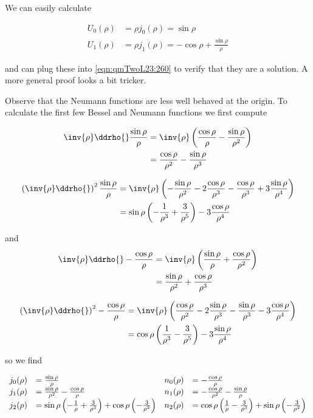 We can easily calculate

\begin{align}\label{eqn:qmTwoL23:300}
U_0(\rho) &= \rho j_0(\rho) = \sin\rho \\
U_1(\rho) &= \rho j_1(\rho) = -\cos\rho + \frac{\sin\rho}{\rho}
\end{align}

and can plug these into \ref{eqn:qmTwoL23:260} to verify that they are a solution.  A more general proof looks a bit tricker.

Observe that the Neumann functions are less well behaved at the origin.  To calculate the first few Bessel and Neumann functions we first compute

\begin{align*}
\inv{\rho} \ddrho{} \frac{\sin\rho}{\rho}
&= \inv{\rho} \left(
\frac{\cos\rho}{\rho}
-\frac{\sin\rho}{\rho^2}
\right) \\
&=
\frac{\cos\rho}{\rho^2}
-\frac{\sin\rho}{\rho^3}
\end{align*}

\begin{align*}
\left( \inv{\rho} \ddrho{} \right)^2 \frac{\sin\rho}{\rho}
&= \inv{\rho} \left(
-\frac{\sin\rho}{\rho^2}
-2\frac{\cos\rho}{\rho^3}
-\frac{\cos\rho}{\rho^3}
+3\frac{\sin\rho}{\rho^4}
\right) \\
&=
\sin\rho\left(
-\frac{1}{\rho^3}
+\frac{3}{\rho^5}
\right)
-3\frac{\cos\rho}{\rho^4}
\end{align*}

and
\begin{align*}
\inv{\rho} \ddrho{} -\frac{\cos\rho}{\rho}
&= \inv{\rho} \left(
\frac{\sin\rho}{\rho}
+\frac{\cos\rho}{\rho^2}
\right) \\
&=
\frac{\sin\rho}{\rho^2}
+\frac{\cos\rho}{\rho^3}
\end{align*}

\begin{align*}
\left( \inv{\rho} \ddrho{} \right)^2 -\frac{\cos\rho}{\rho}
&= \inv{\rho} \left(
\frac{\cos\rho}{\rho^2}
-2\frac{\sin\rho}{\rho^3}
-\frac{\sin\rho}{\rho^3}
-3\frac{\cos\rho}{\rho^4}
\right) \\
&=
\cos\rho\left(
\frac{1}{\rho^3}
-\frac{3}{\rho^5}
\right)
-3\frac{\sin\rho}{\rho^4}
\end{align*}

so we find

\begin{equation}\label{eqn:qmTwoL23:340}
\begin{array}{l l l l}
j_0(\rho) &= \frac{\sin\rho}{\rho} 					& n_0(\rho) &= -\frac{\cos\rho}{\rho} 	\\
j_1(\rho) &= \frac{\sin\rho}{\rho^2} -\frac{\cos\rho}{\rho} 		& n_1(\rho) &= -\frac{\cos\rho}{\rho^2} -\frac{\sin\rho}{\rho} \\
j_2(\rho) &= \sin\rho \left(-\frac{1}{\rho} + \frac{3}{\rho^3} \right) +\cos\rho \left(-\frac{3}{\rho^2} \right)
& n_2(\rho) &= \cos\rho \left(\frac{1}{\rho} - \frac{3}{\rho^3} \right) +\sin\rho \left(-\frac{3}{\rho^2} \right)
\end{array}
\end{equation}

